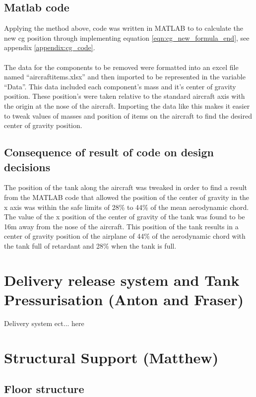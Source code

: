 \subsection{Matlab code}
Applying the method above, code was written in MATLAB to to calculate the new cg position through implementing equation \ref{eqn:cg_new_formula_end}, see appendix \ref{appendix:cg_code}. \\  \\
The data for the components to be removed were formatted into an excel file named “aircraftitems.xlsx” and then imported to be represented in the variable “Data”.
This data included each component's mass and it's center of gravity position.
These position's were taken relative to the standard aircraft axis with the origin at the nose of the aircraft.
Importing the data like this makes it easier to tweak values of masses and position of items on the aircraft to find the desired center of gravity position.

\subsection{Consequence of result of code on design decisions}

The position of the tank along the aircraft was tweaked in order to find a result from the MATLAB code that allowed the position of the center of gravity in the x axis was within the safe limits of 28\% to 44\% of the mean aerodynamic chord.
The value of the x position of the center of gravity of the tank was found to be 16m away from the nose of the aircraft.
This position of the tank results in a center of gravity position of the airplane of 44\% of the aerodynamic chord with the tank full of retardant and 28\% when the tank is full. 

\section{Delivery release system and  Tank Pressurisation (Anton and Fraser)}
Delivery system ect... here
\section{Structural Support (Matthew)}

\subsection{Floor structure}

